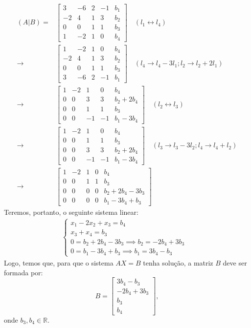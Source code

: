 \begin{align*}
    (A|B) = &\left[\begin{array}{ccccc}
         3 & -6 & 2 & -1 & b_1  \\
         -2 & 4 & 1 & 3 & b_2 \\
         0 & 0 & 1 & 1 & b_3 \\
         1 & -2 & 1 & 0 & b_4  
    \end{array}\right] \quad (l_1 \leftrightarrow l_4) \\ \rightarrow 
    &\left[\begin{array}{ccccc}
         1 & -2 & 1 & 0 & b_4  \\
         -2 & 4 & 1 & 3 & b_2 \\
         0 & 0 & 1 & 1 & b_3 \\
         3 & -6 & 2 & -1 & b_1 
    \end{array}\right] \quad (l_4 \rightarrow l_4 - 3l_1; l_2 \rightarrow l_2 + 2l_1) \\ \rightarrow 
    &\left[\begin{array}{ccccc}
         1 & -2 & 1 & 0 & b_4  \\
         0 & 0 & 3 & 3 & b_2 + 2b_4 \\
         0 & 0 & 1 & 1 & b_3 \\
         0 & 0 & -1 & -1 & b_1 - 3b_4  
    \end{array}\right] \quad (l_2 \leftrightarrow l_3) \\ \rightarrow 
    &\left[\begin{array}{ccccc}
         1 & -2 & 1 & 0 & b_4  \\
         0 & 0 & 1 & 1 & b_3 \\
         0 & 0 & 3 & 3 & b_2 + 2b_4 \\
         0 & 0 & -1 & -1 & b_1 - 3b_4  
    \end{array}\right] \quad (l_3 \rightarrow l_3 - 3l_2; l_4 \rightarrow l_4 + l_2) \\ \rightarrow 
    &\left[\begin{array}{ccccc}
         1 & -2 & 1 & 0 & b_4  \\
         0 & 0 & 1 & 1 & b_3 \\
         0 & 0 & 0 & 0 & b_2 + 2b_4 - 3b_3 \\
         0 & 0 & 0 & 0 & b_1 - 3b_4  + b_3
    \end{array}\right]
\end{align*}
Teremos, portanto, o seguinte sistema linear:
\begin{align*}
    \left\{\begin{array}{cc}
         x_1 - 2x_2 + x_3 = b_4&  \\
         x_3 + x_4 = b_3& \\
         0 = b_2 + 2b_4 - 3b_3 \implies b_2 = -2b_4 + 3b_3& \\
         0 = b_1 - 3b_4 + b_3 \implies b_1 = 3b_4 - b_3&
    \end{array} \right.
\end{align*}
Logo, temos que, para que o sistema $AX = B$ tenha solução, a matriz $B$ deve ser formada por:
\begin{displaymath}
    B = \left[\begin{array}{c}
         3b_4 - b_3 \\
         -2b_4 + 3b_3 \\
         b_3 \\
         b_4
    \end{array}\right],
\end{displaymath}
onde $b_3, b_4 \in \mathbb{R}$.